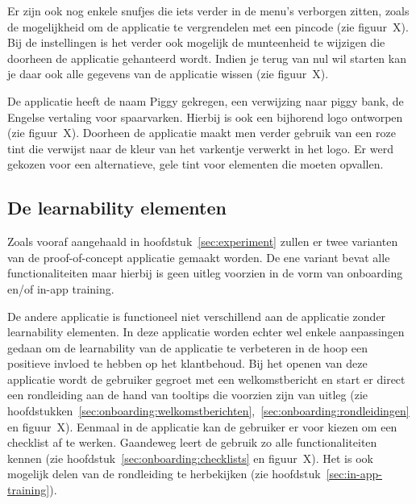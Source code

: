 Er zijn ook nog enkele snufjes die iets verder in de menu's verborgen zitten, zoals de mogelijkheid om de applicatie te vergrendelen met een pincode (zie figuur~X). Bij de instellingen is het verder ook mogelijk de munteenheid te wijzigen die doorheen de applicatie gehanteerd wordt. Indien je terug van nul wil starten kan je daar ook alle gegevens van de applicatie wissen (zie figuur~X).



De applicatie heeft de naam Piggy gekregen, een verwijzing naar piggy bank, de Engelse vertaling voor spaarvarken. Hierbij is ook een bijhorend logo ontworpen (zie figuur~X). Doorheen de applicatie maakt men verder gebruik van een roze tint die verwijst naar de kleur van het varkentje verwerkt in het logo. Er werd gekozen voor een alternatieve, gele tint voor elementen die moeten opvallen.


\subsection{De learnability elementen}
\label{sec:applicatie:learnability-elementen}

Zoals vooraf aangehaald in hoofdstuk~\ref{sec:experiment} zullen er twee varianten van de proof-of-concept applicatie gemaakt worden. De ene variant bevat alle functionaliteiten maar hierbij is geen uitleg voorzien in de vorm van onboarding en/of in-app training.

De andere applicatie is functioneel niet verschillend aan de applicatie zonder learnability elementen. In deze applicatie worden echter wel enkele aanpassingen gedaan om de learnability van de applicatie te verbeteren in de hoop een positieve invloed te hebben op het klantbehoud. Bij het openen van deze applicatie wordt de gebruiker gegroet met een welkomstbericht en start er direct een rondleiding aan de hand van tooltips die voorzien zijn van uitleg (zie hoofdstukken~\ref{sec:onboarding:welkomstberichten},~\ref{sec:onboarding:rondleidingen} en figuur~X). Eenmaal in de applicatie kan de gebruiker er voor kiezen om een checklist af te werken. Gaandeweg leert de gebruik zo alle functionaliteiten kennen (zie hoofdstuk~\ref{sec:onboarding:checklists} en figuur~X). Het is ook mogelijk delen van de rondleiding te herbekijken (zie hoofdstuk~\ref{sec:in-app-training}).



